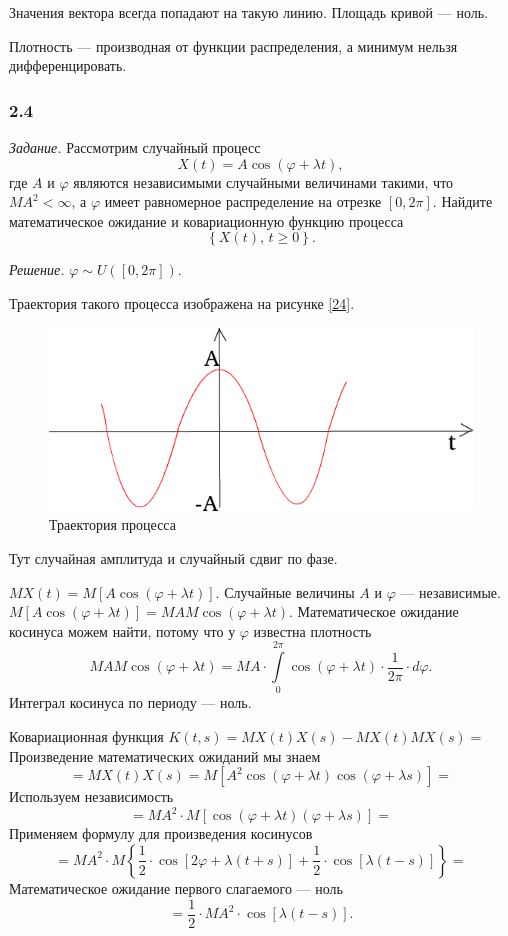 Значения вектора всегда попадают на такую линию.
Площадь кривой --- ноль.

Плотность --- производная от функции распределения, а минимум нельзя дифференцировать.

\subsubsection*{2.4}

\textit{Задание.}
Рассмотрим случайный процесс
$$X \left( t \right) =
  A \cos \left( \varphi + \lambda t \right),$$
где $A$ и $ \varphi $ являются независимыми случайными величинами такими, что $MA^2 < \infty $,
а $ \varphi $ имеет равномерное распределение на отрезке $ \left[ 0, 2 \pi \right] $.
Найдите математическое ожидание и ковариационную функцию процесса
$$ \left\{ X \left( t \right), \, t \geq 0 \right\}.$$

\textit{Решение.} $ \varphi \sim U \left( \left[ 0, 2 \pi \right] \right) $.

Траектория такого процесса изображена на рисунке \ref{24}.

\begin{figure}[h!]
 \centering
 \includegraphics[width=.5\textwidth]{./pictures/2_4.png}
 \caption{Траектория процесса}
 \label{fig:24}
\end{figure}

Тут случайная амплитуда и случайный сдвиг по фазе.

$MX \left( t \right) =
M \left[ A \cos \left( \varphi + \lambda t \right) \right] $.
Случайные величины $A$ и $ \varphi $ --- независимые.
$M \left[ A \cos \left( \varphi + \lambda t \right) \right] =
  MAM \cos \left( \varphi + \lambda t \right) $.
Математическое ожидание косинуса можем найти, потому что у $ \varphi $ известна плотность
$$MAM \cos \left( \varphi + \lambda t \right) =
  MA \cdot \int \limits_0^{2 \pi }
    \cos \left( \varphi + \lambda t \right) \cdot \frac{1}{2 \pi } \cdot d \varphi.$$
Интеграл косинуса по периоду --- ноль.

Ковариационная функция
$K \left( t, s \right) =
  MX \left( t \right) X \left( s \right) - MX \left( t \right) MX \left( s \right) =$
Произведение математических ожиданий мы знаем
$$= MX \left( t \right) X \left( s \right) =
  M \left[
    A^2 \cos \left( \varphi + \lambda t \right) \cos \left( \varphi + \lambda s \right) \right] =$$
Используем независимость
$$= MA^2 \cdot
  M \left[ \cos \left( \varphi + \lambda t \right) \left( \varphi + \lambda s \right) \right] =$$
Применяем формулу для произведения косинусов
$$= MA^2 \cdot M \left\{
    \frac{1}{2} \cdot \cos \left[ 2 \varphi + \lambda \left( t + s \right) \right] +
    \frac{1}{2} \cdot \cos \left[ \lambda \left( t - s \right) \right] \right\} =$$
Математическое ожидание первого слагаемого --- ноль
$$= \frac{1}{2} \cdot MA^2 \cdot \cos \left[ \lambda \left( t - s \right) \right].$$

